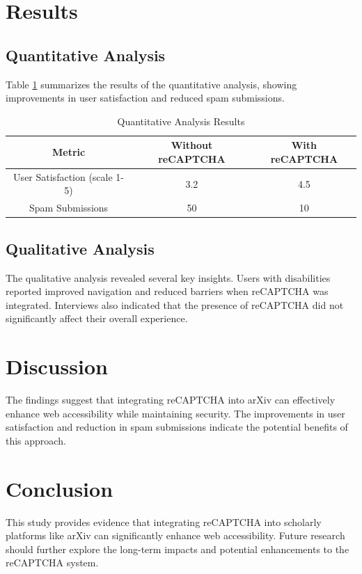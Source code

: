 \documentclass{article}
\begin{document}
\section{Results}
\subsection{Quantitative Analysis}
Table \ref{tab:quantitative} summarizes the results of the quantitative analysis, showing improvements in user satisfaction and reduced spam submissions.

\begin{table}[ht]
\centering
\caption{Quantitative Analysis Results}
\label{tab:quantitative}
\begin{tabular}{|c|c|c|}
\hline
\textbf{Metric} & \textbf{Without reCAPTCHA} & \textbf{With reCAPTCHA} \\
\hline
User Satisfaction (scale 1-5) & 3.2 & 4.5 \\
Spam Submissions & 50 & 10 \\
\hline
\end{tabular}
\end{table}

\subsection{Qualitative Analysis}
The qualitative analysis revealed several key insights. Users with disabilities reported improved navigation and reduced barriers when reCAPTCHA was integrated. Interviews also indicated that the presence of reCAPTCHA did not significantly affect their overall experience.

\section{Discussion}
The findings suggest that integrating reCAPTCHA into arXiv can effectively enhance web accessibility while maintaining security. The improvements in user satisfaction and reduction in spam submissions indicate the potential benefits of this approach.

\section{Conclusion}
This study provides evidence that integrating reCAPTCHA into scholarly platforms like arXiv can significantly enhance web accessibility. Future research should further explore the long-term impacts and potential enhancements to the reCAPTCHA system.
\end{document}
